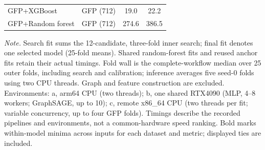 \begin{table}[p]
\begin{threeparttable}
\begin{tabular}{llrrrr}
GFP+XGBoost & GFP (712) & \multicolumn{2}{c}{19.0} & \multicolumn{2}{c}{22.2} \\
GFP+Random forest & GFP (712) & \multicolumn{2}{c}{274.6} & \multicolumn{2}{c}{386.5} \\
\bottomrule
\end{tabular}
\begin{tablenotes}[flushleft]
\footnotesize
\setlength{\labelsep}{0pt}\item[] \textit{Note.} Search fit sums the 12-candidate, three-fold inner search; final fit denotes one selected model (25-fold means). Shared random-forest fits and reused anchor fits retain their actual timings. Fold wall is the complete-workflow median over 25 outer folds, including search and calibration; inference averages five seed-0 folds using two CPU threads. Graph and feature construction are excluded. Environments: a, arm64 CPU (two threads); b, one shared RTX4090 (MLP, 4--8 workers; GraphSAGE, up to 10); c, remote x86\_64 CPU (two threads per fit; variable concurrency, up to four GFP folds). Timings describe the recorded pipelines and environments, not a common-hardware speed ranking. Bold marks within-model minima across inputs for each dataset and metric; displayed ties are included.
\end{tablenotes}
\end{threeparttable}
\end{table}
